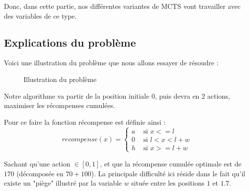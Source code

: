 \documentclass[pdftex,french, english]{article}	%
\begin{document}
	Donc, dans cette partie, nos différentes variantes de MCTS vont travailler avec des variables de ce type.

	\subsection{Explications du problème} \label{probleme}

	Voici une illustration du problème \cite{couetoux01} que nous allons essayer de résoudre : \\

	\begin{figure}[h]
	\centering
		\caption{Illustration du problème} \label{fig:probleme}
	\end{figure}

	Notre algorithme va partir de la position initiale $0$, puis devra en $2$ actions, maximiser les récompenses cumulées.

	Pour ce faire la fonction récompense est définie ainsi :
	$$recompense(x) = \left\{
	\begin{array}{ll}
 	a & \mbox{ si $x <= l$}\\
 	0 & \mbox{ si $l < x < l + w$}\\
 	h & \mbox{ si $x >= l + w$}
 	\end{array}\right.$$

	Sachant qu'une action $\in [0, 1]$, et que la récompense cumulée optimale est de $170$ (décomposée en $70 + 100$).
	La principale difficulté ici réside dans le fait qu'il existe un "piège" illustré par la variable $w$ située entre les positions $1$ et $1.7$.
\end{document}

